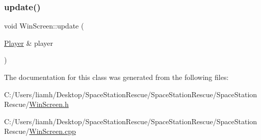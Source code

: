 \mbox{\label{class_win_screen_a5abaf2936e43ab89b4f7bb3a156ff898}} 
\subsubsection{\texorpdfstring{update()}{update()}}
{\footnotesize\ttfamily void Win\+Screen\+::update (\begin{DoxyParamCaption}\item[{\mbox{\hyperlink{class_player}{Player}} \&}]{player }\end{DoxyParamCaption})}



The documentation for this class was generated from the following files\+:\begin{DoxyCompactItemize}
\item 
C\+:/\+Users/liamh/\+Desktop/\+Space\+Station\+Rescue/\+Space\+Station\+Rescue/\+Space\+Station\+Rescue/\mbox{\hyperlink{_win_screen_8h}{Win\+Screen.\+h}}\item 
C\+:/\+Users/liamh/\+Desktop/\+Space\+Station\+Rescue/\+Space\+Station\+Rescue/\+Space\+Station\+Rescue/\mbox{\hyperlink{_win_screen_8cpp}{Win\+Screen.\+cpp}}\end{DoxyCompactItemize}

